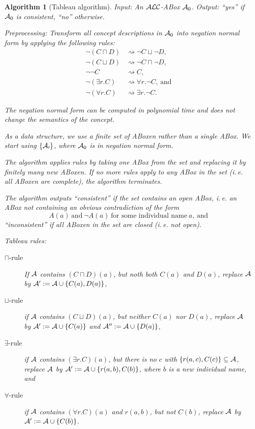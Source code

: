 \documentclass[openany]{scrbook}
\theoremstyle{break}
\newtheorem{Algorithm}[Theorem]{Algorithm}
\theoremstyle{nonumberbreak}
\theoremstyle{nonumberplain}
\theoremstyle{nonumberbreak}
\newcommand{\set}[1]{\left\{#1\right\}}
\newcommand{\ie}{i{.}\,e{.}\xspace}
\newcommand{\ALC}{{\cal A}{\cal L}{\cal C}}
\begin{document}
\begin{Algorithm}[Tableau algorithm]
  Input: An $\ALC$-ABox ${\cal A}_0$. Output: ``yes'' if ${\cal A}_0$
  is consistent, ``no'' otherwise.

  Preprocessing: Transform all concept descriptions in ${\cal A}_0$
  into negation normal form by applying the following rules:
  \begin{align*}
    \neg(C \sqcap D) & \rightsquigarrow \neg C \sqcup \neg D, \\
    \neg(C \sqcup D) & \rightsquigarrow \neg C \sqcap \neg D, \\
    \neg\neg C & \rightsquigarrow C, \\
    \neg(\exists r.C) & \rightsquigarrow \forall r. \neg C,\
    \text{and} \\
    \neg(\forall r.C) & \rightsquigarrow \exists r.\neg C.
  \end{align*}

  The negation normal form can be computed in polynomial time and does
  not change the semantics of the concept.

  As a data structure, we use a finite set of ABoxen rather than a
  single ABox. We start using $\set{{\cal A_0}}$, where ${\cal A}_0$
  is in negation normal form.

  The algorithm applies rules by taking one ABox from the set and replacing
  it by finitely many new ABoxen. If no more rules apply to any ABox
  in the set (\ie all ABoxen are complete), the algorithm terminates.

  The algorithm outputs ``consistent'' if the set contains an open
  ABox, \ie an ABox not containing an obvious contradiction of the
  form
  \begin{equation*}
    A(a)\ \text{and}\ \neg A(a)\ \text{for some individual name}\ a,\ \text{and}
  \end{equation*}
  ``inconsistent'' if all ABoxen in the set are closed (\ie not
  open).

  Tableau rules:
  \begin{description}
  \item[$\sqcap$-rule] If ${\cal A}$ contains $(C \sqcap D)(a)$, but
    noth both $C(a)$ and $D(a)$, replace ${\cal A}$ by ${\cal A}' :=
    {\cal A} \cup \set{C(a), D(a)}$,
  \item[$\sqcup$-rule] if ${\cal A}$ contains $(C \sqcup D)(a)$, but
    neither $C(a)$ nor $D(a)$, replace ${\cal A}$ by ${\cal A}' :=
    {\cal A} \cup \set{C(a)}$ and ${\cal A}'' := {\cal A} \cup \set{D(a)}$,
  \item[$\exists$-rule] if ${\cal A}$ contains $(\exists r.C)(a)$, but
    there is no $c$ with $\set{r(a, c), C(c)} \subseteq {\cal A}$,
    replace ${\cal A}$ by ${\cal A}' := {\cal A} \cup \set{r(a, b),
      C(b)}$, where $b$ is a new individual name, and
  \item[$\forall$-rule] if ${\cal A}$ contains $(\forall r.C)(a)$ and
    $r(a, b)$, but not $C(b)$, replace ${\cal A}$ by ${\cal A}' :=
    {\cal A} \cup \set{C(b)}$.
  \end{description}
\end{Algorithm}
\end{document}
